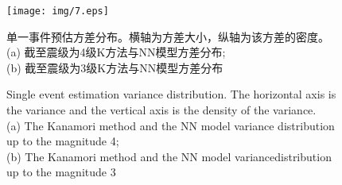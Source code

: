 \begin{figure}[!h] 
\centering 
 \texttt{[image: img/7.eps]} 
 \renewcommand{\figurename}{图} 
\caption{单一事件预估方差分布。横轴为方差大小，纵轴为该方差的密度。\\
(a) 截至震级为4级K方法与NN模型方差分布;\\
(b) 截至震级为3级K方法与NN模型方差分布} 
\addtocounter{figure}{-1} \vspace{-5pt} 
\renewcommand{\figurename}{Fig} 
\caption{Single event estimation variance distribution. The horizontal axis is the variance and the vertical axis is the density of the variance.\\
(a) The Kanamori method and the NN model variance distribution up to the
magnitude 4; \\
(b) The Kanamori method and the NN model variancedistribution up to the magnitude 3} 
\renewcommand{\figurename}{图} 
\label{fig:network-device-influence.png} 
\end{figure}